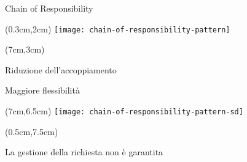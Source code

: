 \begin{frame}[t,noframenumbering]{Chain of Responsibility}
\begin{textblock*}{1cm}(0.3cm,2cm)
  \texttt{[image: chain-of-responsibility-pattern]}
\end{textblock*}
\begin{textblock*}{6cm}(7cm,3cm)
  \begin{adv}
  \item Riduzione dell'accoppiamento
  \item Maggiore flessibilità
  \end{adv}
\end{textblock*}
\begin{textblock*}{1cm}(7cm,6.5cm)
  \texttt{[image: chain-of-responsibility-pattern-sd]}
\end{textblock*}
\begin{textblock*}{6cm}(0.5cm,7.5cm)
  \begin{disadv}
  \item La gestione della richiesta non è garantita
  \end{disadv}
\end{textblock*}
\end{frame}